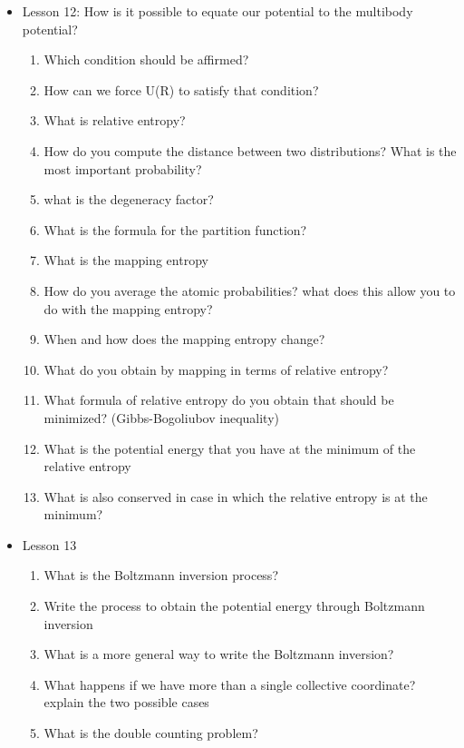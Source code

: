 {\begin{itemize}
\begin{enumerate}
        \item How do you allow the consistency condition for the momenta?
    \end{enumerate}
    \item Lesson 12: How is it possible to equate our potential to the multibody potential?
    \begin{enumerate}
        \item Which condition should be affirmed?
        \item How can we force U(R) to satisfy that condition?
        \item What is relative entropy?
        \item How do you compute the distance between two distributions? What is the most important probability?
        \item what is the degeneracy factor?
        \item What is the formula for the partition function?
        \item What is the mapping entropy
        \item How do you average the atomic probabilities? what does this allow you to do with the mapping entropy?
        \item When and how does the mapping entropy change?
        \item What do you obtain by mapping in terms of relative entropy?
        \item What formula of relative entropy do you obtain that should be minimized? (Gibbs-Bogoliubov inequality)
        \item What is the potential energy that you have at the minimum of the relative entropy
        \item What is also conserved in case in which the relative entropy is at the minimum?
    \end{enumerate}
    \item Lesson 13
    \begin{enumerate}
        \item What is the Boltzmann inversion process?
        \item Write the process to obtain the potential energy through Boltzmann inversion
        \item What is a more general way to write the Boltzmann inversion?
        \item What happens if we have more  than a single collective coordinate? explain the two possible cases
        \item What is the double counting problem?

\end{enumerate}
\end{itemize}}
